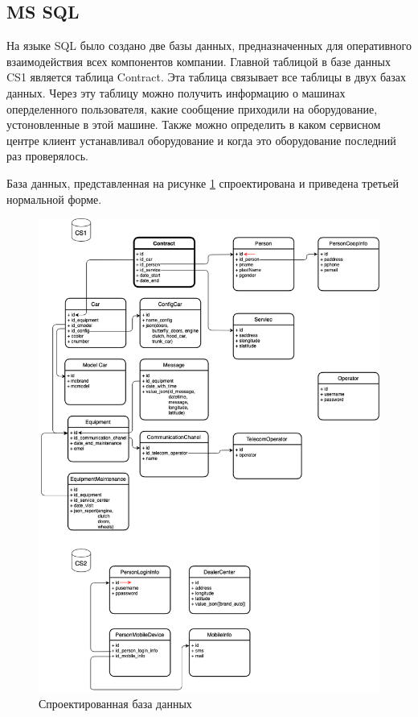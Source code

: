 \newpage
\subsection{MS SQL}

\vspace{0.5cm}
\hspace{0.6cm}
На языке SQL было создано две базы данных, предназначенных для оперативного взаимодействия всех компонентов компании. Главной таблицой в базе данных CS1 является таблица Contract. Эта таблица связывает все таблицы в двух базах данных. Через эту таблицу можно получить информацию о машинах оперделенного пользователя, какие сообщение приходили на оборудование, устоновленные в этой машине. Также можно определить в каком сервисном центре клиент устанавливал оборудование и когда это оборудование последний раз проверялось.

\vspace{0.1cm}
База данных, представленная на рисунке \ref{img:db_cs} спроектирована и приведена третьей нормальной форме.

\newpage
\begin{figure}[H]
	\centering
	\includegraphics[scale=0.52]{img/bd_cs.png}
	\caption{Спроектированная база данных}
	\label{img:db_cs}
\end{figure}


